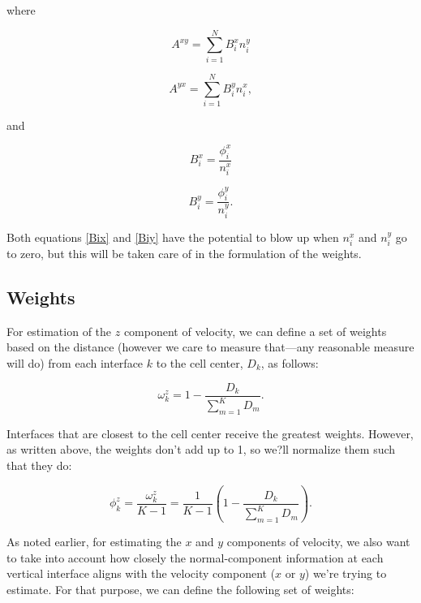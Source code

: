 \noindent where

\begin{equation}
\label{Axy}
A^{xy} = \sum_{i=1}^N B_i^x n_i^y
\end{equation}

\begin{equation}
\label{Ayx}
A^{yx} = \sum_{i=1}^N B_i^y n_i^x,
\end{equation}

\noindent and

\begin{equation}
\label{Bix}
B_i^x = \frac{\phi_i^x}{n_i^x}
\end{equation}

\begin{equation}
\label{Biy}
B_i^y = \frac{\phi_i^y}{n_i^y}.
\end{equation}

Both equations \ref{Bix} and \ref{Biy} have the potential to blow up when $n_i^x$ and $n_i^y$ go to zero, but this will be taken care of in the formulation of the weights.

\subsection{Weights}

For estimation of the $z$ component of velocity, we can define a set of weights based on the distance (however we care to measure that---any reasonable measure will do) from each interface $k$ to the cell center, $D_k$, as follows:

\begin{equation}
\label{omegaz}
\omega_k^z = 1 - \frac{D_k}{\sum_{m=1}^K D_m}.
\end{equation}

Interfaces that are closest to the cell center receive the greatest weights. However, as written above, the weights don't add up to 1, so we?ll normalize them such that they do:

\begin{equation}
\label{phiz}
\phi_k^z = \frac{\omega_k^z}{K - 1} = \frac{1}{K - 1} \left (1 - \frac{D_k}{\sum_{m=1}^K D_m} \right ).
\end{equation}

As noted earlier, for estimating the $x$ and $y$ components of velocity, we also want to take into account how closely the normal-component information at each vertical interface aligns with the velocity component ($x$ or $y$) we're trying to estimate.  For that purpose, we can define the following set of weights:

